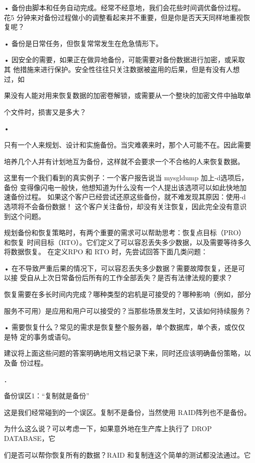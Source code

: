 • 备份由脚本和任务自动完成。经常不经意地，我们会花些时间调优备份过程。花5
分钟来对备份过程做小的调整看起来并不重要，但是你是否天天同样地重视恢复呢？

• 备份是日常任务，但恢复常常发生在危急情形下。

• 因安全的需要，如果正在做异地备份，可能需要对备份数据进行加密，或采取其
他措施来进行保护。安全性往往只关注数据被盗用的后果，但是有没有人想过，如

果没有人能对用来恢复数据的加密卷解锁，或需要从一个整块的加密文件中抽取单

个文件时，损害又是多大？

•

只有一个人来规划、设计和实施备份。当灾难袭来时，那个人可能不在。因此需要

培养几个人并有计划地互为备份，这样就不会要求一个不合格的人来恢复数据。

这里有一个我们看到的真实例子：一个客户报告说当 mysgldump 加上-d选项后，备份
变得像闪电一般快，他想知道为什么没有一个人提出该选项可以如此快地加速备份过程。
如果这个客户已经尝试还原这些备份，就不难发现其原因：使用-d选项将不会备份数据！
这个客户关注备份，却没有关注恢复，因此完全没有意识到这个问题。

规划备份和恢复策略时，有两个重要的需求可以帮助思考：恢复点目标（PRO）和恢复
时间目标（RTO）。它们定义了可以容忍丢失多少数据，以及需要等待多久将数据恢复。
在定义RPO 和 RTO 时，先尝试回答下面几类问题：

• 在不导致严重后果的情况下，可以容忍丢失多少数据？需要故障恢复，还是可以接
受自从上次日常备份后所有的工作全部丢失？是否有法律法规的要求？

恢复需要在多长时间内完成？哪种类型的宕机是可接受的？哪种影响（例如，部分

服务不可用）是应用和用户可以接受的？当那些场景发生时，又该如何持续服务？

• 需要恢复什么？常见的需求是恢复整个服务器，单个数据库，单个表，或仅仅是特
定的事务或语句。

建议将上面这些问题的答案明确地用文档记录下来，同时还应该明确备份策略，以及备
份过程。

．

备份误区1：“复制就是备份”

这是我们经常碰到的一个误区。复制不是备份，当然使用 RAID阵列也不是备份。

为什么这么说？可以考虑一下，如果意外地在生产库上执行了 DROP DATABASE，它

们是否可以帮你恢复所有的数据？RAID 和复制连这个简单的测试都没法通过。它

